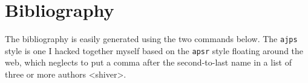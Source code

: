 \documentclass[12pt]{article}
\begin{document}
\section{Bibliography}
The bibliography is easily generated using the two commands below.  The \verb+ajps+ style is one I hacked together myself based on the \verb+apsr+ style floating around the web, which neglects to put a comma after the second-to-last name in a list of three or more authors <shiver>. 



\end{document}
